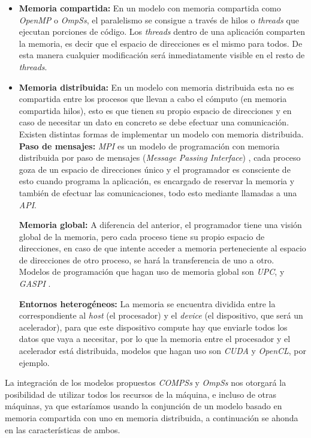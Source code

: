 \begin{itemize}
\item \textbf{Memoria compartida:} En un modelo con memoria compartida como \textit{OpenMP} o \textit{OmpSs}, el paralelismo se consigue a través de hilos o \textit{threads} que ejecutan porciones de código. Los \textit{threads} dentro de una aplicación comparten la memoria, es decir que el espacio de direcciones es el mismo para todos. De esta manera cualquier modificación será inmediatamente visible en el resto de \textit{threads}.
\item \textbf{Memoria distribuida:} En un modelo con memoria distribuida esta no es compartida entre los procesos que llevan a cabo el cómputo (en memoria compartida hilos), esto es que tienen su propio espacio de direcciones y en caso de necesitar un dato en concreto se debe efectuar una comunicación. Existen distintas formas de implementar un modelo con memoria distribuida.
		\subitem \textbf{Paso de mensajes:} \textit{MPI} es un modelo de programación con memoria distribuida por paso de mensajes (\textit{Message Passing Interface}) , cada proceso goza de un espacio de direcciones único y el programador es consciente de esto cuando programa la aplicación, es encargado de reservar la memoria y también de efectuar las comunicaciones, todo esto mediante llamadas a una \textit{API}.

		\subitem \textbf{Memoria global:} A diferencia del anterior, el programador tiene una visión global de la memoria, pero cada proceso tiene su propio espacio de direcciones, en caso de que intente acceder a memoria perteneciente al espacio de direcciones de otro proceso, se hará la transferencia de uno a otro. Modelos de programación que hagan uso de memoria global son \textit{UPC}\cite{berkupc}, y \textit{GASPI}\cite{grunewald2013gaspi} .
 
		\subitem \textbf{Entornos heterogéneos:} La memoria se encuentra dividida entre la correspondiente al \textit{host} (el procesador) y el \textit{device} (el dispositivo, que será un acelerador), para que este dispositivo compute hay que enviarle todos los datos que vaya a necesitar, por lo que la memoria entre el procesador y el acelerador está distribuida, modelos que hagan uso son \textit{CUDA}\cite{luebke2008cuda} y \textit{OpenCL}\cite{stone2010opencl}, por ejemplo.
\end{itemize}

\par\bigskip
La integración de los modelos propuestos \textit{COMPSs} y \textit{OmpSs} nos otorgará la posibilidad de utilizar todos los recursos de la máquina, e incluso de otras máquinas, ya que estaríamos usando la conjunción de un modelo basado en memoria compartida con uno en memoria distribuida, a continuación se ahonda en las características de ambos.

